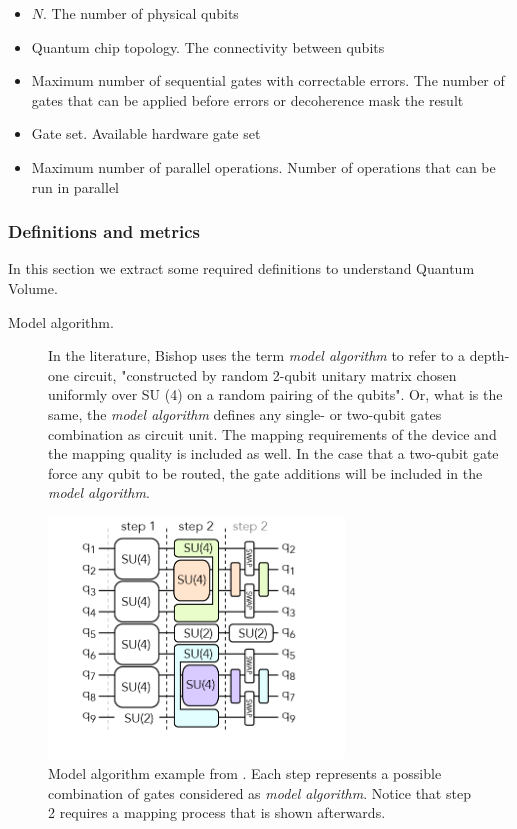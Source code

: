 \documentclass[11pt]{article}
\begin{document}
\begin{itemize}
\item \(N\). The number of physical qubits
\item Quantum chip topology. The connectivity between qubits
\item Maximum number of sequential gates with correctable errors. The number of gates that can be applied before errors or decoherence mask the result
\item Gate set. Available hardware gate set
\item Maximum number of parallel operations. Number of operations that can be run in parallel
\end{itemize}

\subsubsection{Definitions and metrics}
\label{sec:org856dad9}

In this section we extract some required definitions \cite{Bishop_2017,Moll_2018} to understand Quantum Volume.


\begin{description}
\item[{Model algorithm.}] In the literature, Bishop uses the term \emph{model algorithm} \cite{Bishop_2017} to refer to a depth-one circuit, "constructed by random 2-qubit unitary matrix chosen uniformly over SU (4) on a random pairing of the qubits". Or, what is the same, the \emph{model algorithm} defines any single- or two-qubit gates combination as circuit unit. The mapping requirements of the device and the mapping quality is included as well. In the case that a two-qubit gate force any qubit to be routed, the gate additions will be included in the \emph{model algorithm}.
\end{description}

\begin{figure}[htbp]
\centering
\includegraphics[width=0.7\textwidth]{model_algorithm.png}
\caption{\label{fig:org457f52e}
Model algorithm example from \cite{Moll_2018}. Each step represents a possible combination of gates considered as \emph{model algorithm}. Notice that step 2 requires a mapping process that is shown afterwards.}
\end{figure}
\end{document}
